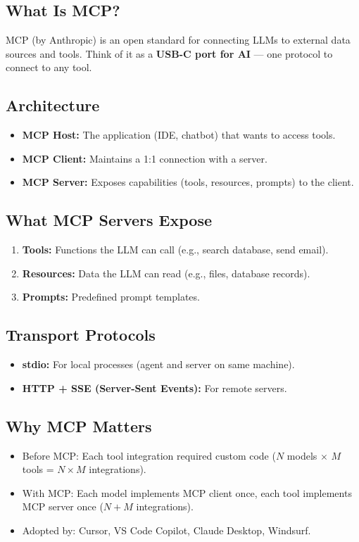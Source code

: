 \documentclass[11pt,a4paper]{article}
\begin{document}
\subsection{What Is MCP?}
MCP (by Anthropic) is an open standard for connecting LLMs to external data sources and tools. Think of it as a \textbf{USB-C port for AI} --- one protocol to connect to any tool.

\subsection{Architecture}
\begin{itemize}[nosep]
  \item \textbf{MCP Host:} The application (IDE, chatbot) that wants to access tools.
  \item \textbf{MCP Client:} Maintains a 1:1 connection with a server.
  \item \textbf{MCP Server:} Exposes capabilities (tools, resources, prompts) to the client.
\end{itemize}

\subsection{What MCP Servers Expose}
\begin{enumerate}[nosep]
  \item \textbf{Tools:} Functions the LLM can call (e.g., search database, send email).
  \item \textbf{Resources:} Data the LLM can read (e.g., files, database records).
  \item \textbf{Prompts:} Predefined prompt templates.
\end{enumerate}

\subsection{Transport Protocols}
\begin{itemize}[nosep]
  \item \textbf{stdio:} For local processes (agent and server on same machine).
  \item \textbf{HTTP + SSE (Server-Sent Events):} For remote servers.
\end{itemize}

\subsection{Why MCP Matters}
\begin{itemize}[nosep]
  \item Before MCP: Each tool integration required custom code ($N$ models $\times$ $M$ tools = $N \times M$ integrations).
  \item With MCP: Each model implements MCP client once, each tool implements MCP server once ($N + M$ integrations).
  \item Adopted by: Cursor, VS Code Copilot, Claude Desktop, Windsurf.
\end{itemize}
\end{document}
